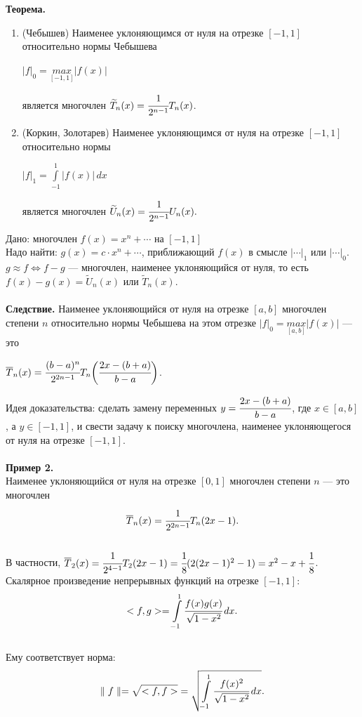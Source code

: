 \documentclass[12pt]{article}
\theoremstyle{definition}
\numberwithin{equation}{section}
\begin{document}
\textbf{Теорема.}\begin{enumerate}
\item (Чебышев) Наименее уклоняющимся от нуля на отрезке $[-1, 1]$ относительно нормы Чебышева\begin{center} $|f|_0=\underset{[-1, 1]}{max}|f(x)|$ \end{center} является многочлен $\widetilde T_n(x)=\cfrac{1}{2^{n-1}}T_n(x)$.
\item (Коркин, Золотарев) Наименее уклоняющимся от нуля на отрезке $[-1, 1]$ относительно нормы \begin{center}$|f|_1=\int\limits_{-1}^1 |f(x)|\,dx$ \end{center} является многочлен $\widetilde U_n(x)=\cfrac{1}{2^{n-1}}U_n(x).$
\end{enumerate}
Дано: многочлен $f(x)=x^n+\cdots$ на $[-1, 1]$\\
Надо найти: $g(x)=c \cdot x^n+\cdots$, приближающий $f(x)$ в смысле $|\cdots|_1$ или $|\cdots|_0$.\\
$g \approx f \Leftrightarrow f-g$ --- многочлен, наименее уклоняющийся от нуля, то есть $f(x)-g(x) = \widetilde U_n(x)$ или $\widetilde T_n(x)$.\\
\\
\textbf{Следствие.}
Наименее уклоняющийся от нуля на отрезке $[a, b]$ многочлен степени $n$ относительно нормы Чебышева на этом отрезке $|f|_0=\underset{[a, b]}{max}|f(x)|$ --- это \begin{center}$\overline T_n(x) = \cfrac{(b-a)^n}{2^{2n-1}}T_n \bigg(\cfrac{2x-(b+a)}{b-a} \bigg)$.\end{center}
Идея доказательства: сделать замену переменных $y=\cfrac{2x-(b+a)}{b-a}$, где $x\in [a, b]$, а $y \in [-1, 1]$, и свести задачу к поиску многочлена, наименее уклоняющегося от нуля на отрезке $[-1, 1]$.\\
\\
\textbf{Пример 2.}\\
Наименее уклоняющийся от нуля на отрезке $[0, 1]$ многочлен степени $n$ --- это многочлен $$\overline T_n(x)=\cfrac{1}{2^{2n-1}}T_n(2x-1).$$\\
В частности, $\overline T_2(x)=\cfrac{1}{2^{4-1}}T_2(2x-1)=\cfrac{1}{8}(2(2x-1)^2-1)=x^2-x+\cfrac{1}{8}$.\\
\noindent Скалярное произведение непрерывных функций на отрезке $[-1, 1]:$ $$<f, g>=\int\limits_{-1}^1 \cfrac{f(x)g(x)}{\sqrt{1-x^2}}\,dx.$$\\
Ему соответствует норма: $$\parallel f \parallel=\sqrt{<f,f>}=\sqrt{\int\limits_{-1}^1 \cfrac{f(x)^2}{\sqrt{1-x^2}}\,dx}.$$\\
\end{document}
